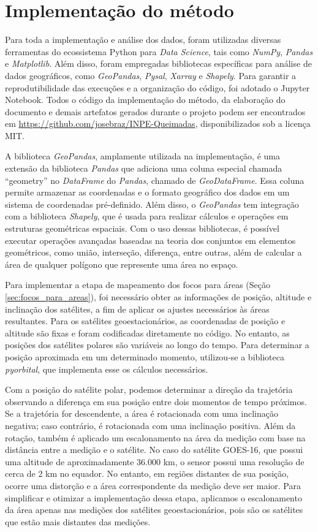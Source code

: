 \documentclass[cic,tc]{iiufrgs}
\begin{document}
\section{Implementação do método}

Para toda a implementação e análise dos dados, foram utilizadas diversas ferramentas do ecossistema Python para \textit{Data Science}, tais como \textit{NumPy}, \textit{Pandas} e \textit{Matplotlib}. Além disso, foram empregadas bibliotecas específicas para análise de dados geográficos, como \textit{GeoPandas}, \textit{Pysal}, \textit{Xarray} e \textit{Shapely}. Para garantir a reprodutibilidade das execuções e a organização do código, foi adotado o Jupyter Notebook. Todos o código da implementação do método, da elaboração do documento e demais artefatos gerados durante o projeto podem ser encontrados em \url{https://github.com/josebraz/INPE-Queimadas}, disponibilizados sob a licença MIT.

A biblioteca \textit{GeoPandas}, amplamente utilizada na implementação, é uma extensão da biblioteca \textit{Pandas} que adiciona uma coluna especial chamada ``geometry'' no \textit{DataFrame} do \textit{Pandas}, chamado de \textit{GeoDataFrame}. Essa coluna permite armazenar as coordenadas e o formato geográfico dos dados em um sistema de coordenadas pré-definido. Além disso, o \textit{GeoPandas} tem integração com a biblioteca \textit{Shapely}, que é usada para realizar cálculos e operações em estruturas geométricas espaciais. Com o uso dessas bibliotecas, é possível executar operações avançadas baseadas na teoria dos conjuntos em elementos geométricos, como união, interseção, diferença, entre outras, além de calcular a área de qualquer polígono que represente uma área no espaço.

Para implementar a etapa de mapeamento dos focos para áreas (Seção \ref{sec:focos_para_areas}), foi necessário obter as informações de posição, altitude e inclinação dos satélites, a fim de aplicar os ajustes necessários às áreas resultantes. Para os satélites geoestacionários, as coordenadas de posição e altitude são fixas e foram codificadas diretamente no código. No entanto, as posições dos satélites polares são variáveis ao longo do tempo. Para determinar a posição aproximada em um determinado momento, utilizou-se a biblioteca \textit{pyorbital}, que implementa esse os cálculos necessários.

Com a posição do satélite polar, podemos determinar a direção da trajetória observando a diferença em sua posição entre dois momentos de tempo próximos. Se a trajetória for descendente, a área é rotacionada com uma inclinação negativa; caso contrário, é rotacionada com uma inclinação positiva. Além da rotação, também é aplicado um escalonamento na área da medição com base na distância entre a medição e o satélite. No caso do satélite GOES-16, que possui uma altitude de aproximadamente 36.000 km, o sensor possui uma resolução de cerca de 2 km no equador. No entanto, em regiões distantes de sua posição, ocorre uma distorção e a área correspondente da medição deve ser maior. Para simplificar e otimizar a implementação dessa etapa, aplicamos o escalonamento da área apenas nas medições dos satélites geoestacionários, pois são os satélites que estão mais distantes das medições.
\end{document}

